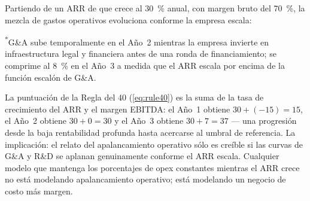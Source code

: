 \begin{example}
Partiendo de un ARR de  que crece al \qty{30}{\percent} anual, con margen bruto
del \qty{70}{\percent}, la mezcla de gastos operativos evoluciona conforme la empresa escala:

\medskip
\noindent{}

\medskip
\noindent\textsuperscript{*}G\&A sube temporalmente en el Año~2 mientras la empresa invierte
en infraestructura legal y financiera antes de una ronda de financiamiento; se comprime al
\qty{8}{\percent} en el Año~3 a medida que el ARR escala por encima de la función escalón de
G\&A.

\medskip
La puntuación de la Regla del 40 (\cref{eq:rule40}) es la suma de la tasa de crecimiento del
ARR y el margen EBITDA: el Año~1 obtiene \(30+(-15)=15\), el Año~2 obtiene \(30+0=30\) y el
Año~3 obtiene \(30+7=37\) --- una progresión desde la baja rentabilidad profunda hasta acercarse
al umbral de referencia. La implicación: el relato del apalancamiento operativo sólo es creíble
si las curvas de G\&A y R\&D se aplanan genuinamente conforme el ARR escala. Cualquier modelo
que mantenga los porcentajes de opex constantes mientras el ARR crece no está modelando
apalancamiento operativo; está modelando un negocio de costo más margen.
\end{example}

